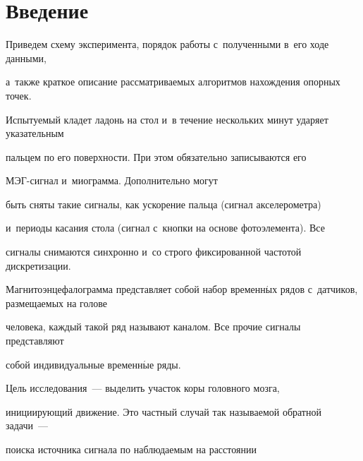 


















      \thispagestyle{headings}





\section{Введение}


Приведем схему эксперимента, порядок работы с~полученными в~его ходе данными,


а~также краткое описание рассматриваемых алгоритмов нахождения опорных точек.





Испытуемый кладет ладонь на стол и~в течение нескольких минут ударяет указательным


пальцем по его поверхности. При этом обязательно записываются его


 МЭГ-сиг\-нал и~миограмма. Дополнительно могут


быть сняты такие сигналы, как ускорение пальца (сигнал акселерометра)


и~периоды касания стола (сигнал с~кнопки на основе фотоэлемента). Все


сигналы снимаются синхронно и~со строго фиксированной частотой дискретизации.


Магнитоэнцефалограмма представляет собой набор временн$\acute{\mbox{ы}}$х рядов с~датчиков, размещаемых на голове


человека, каждый такой ряд называют каналом. Все прочие сигналы представляют


собой индивидуальные временн$\acute{\mbox{ы}}$е ряды.





Цель исследования~--- выделить участок коры головного мозга,


иницииру\-ющий движение. Это частный случай так называемой обратной задачи~---


поиска источника сигнала по наблюдаемым на расстоянии


